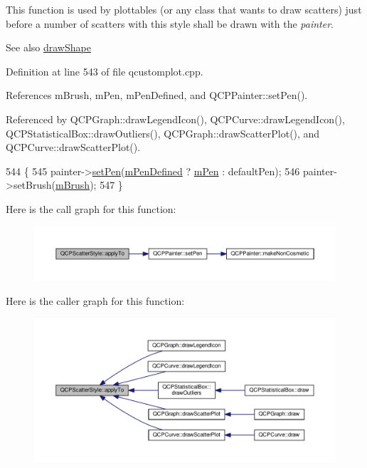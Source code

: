 This function is used by plottables (or any class that wants to draw scatters) just before a number of scatters with this style shall be drawn with the {\itshape painter}.

\begin{DoxySeeAlso}{See also}
\hyperlink{class_q_c_p_scatter_style_a992d531ac471ec2b29bdec6aeb400a06}{draw\+Shape} 
\end{DoxySeeAlso}


Definition at line 543 of file qcustomplot.\+cpp.



References m\+Brush, m\+Pen, m\+Pen\+Defined, and Q\+C\+P\+Painter\+::set\+Pen().



Referenced by Q\+C\+P\+Graph\+::draw\+Legend\+Icon(), Q\+C\+P\+Curve\+::draw\+Legend\+Icon(), Q\+C\+P\+Statistical\+Box\+::draw\+Outliers(), Q\+C\+P\+Graph\+::draw\+Scatter\+Plot(), and Q\+C\+P\+Curve\+::draw\+Scatter\+Plot().


\begin{DoxyCode}
544                                                             \{
545   painter->\hyperlink{class_q_c_p_painter_af9c7a4cd1791403901f8c5b82a150195}{setPen}(\hyperlink{class_q_c_p_scatter_style_a84ef5aa591ddba07b440f597e1669e78}{mPenDefined} ? \hyperlink{class_q_c_p_scatter_style_a0f6a85e6d1e3ae1ca1b6efb4d4cdfe17}{mPen} : defaultPen);
546   painter->setBrush(\hyperlink{class_q_c_p_scatter_style_a1b9c6ab10aebcaf236f1f45d1d6d64d1}{mBrush});
547 \}
\end{DoxyCode}


Here is the call graph for this function\+:\nopagebreak
\begin{figure}[H]
\begin{center}
\leavevmode
\includegraphics[width=350pt]{class_q_c_p_scatter_style_a81817dfd404635f211e6ff2a04657d36_cgraph}
\end{center}
\end{figure}




Here is the caller graph for this function\+:\nopagebreak
\begin{figure}[H]
\begin{center}
\leavevmode
\includegraphics[width=350pt]{class_q_c_p_scatter_style_a81817dfd404635f211e6ff2a04657d36_icgraph}
\end{center}
\end{figure}


